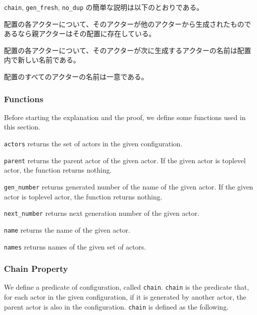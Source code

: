 \texttt{chain}, \texttt{gen\_fresh}, \texttt{no\_dup} の簡単な説明は以下のとおりである。

\begin{description}[style=nextline,leftmargin=12pt,parsep=0pt]
\item[\texttt{chain}]
  配置の各アクターについて、そのアクターが他のアクターから生成されたものであるなら親アクターはその配置に存在している。
\item[\texttt{gen\_fresh}]
  配置の各アクターについて、そのアクターが次に生成するアクターの名前は配置内で新しい名前である。
\item[\texttt{no\_dup}]
  配置のすべてのアクターの名前は一意である。
\end{description}

\subsubsection{Functions}

Before starting the explanation and the proof, we define some functions used in this section.

\begin{description}[style=nextline,leftmargin=12pt,parsep=0pt]
\item[\texttt{actors} $: \textit{Configuration} \rightarrow \textit{Set(Actor)}$]
  \texttt{actors} returns the set of actors in the given configuration.
\item[\texttt{parent} $: \textit{Actor} \rightarrow \textit{Actor}$]
  \texttt{parent} returns the parent actor of the given actor.
  If the given actor is toplevel actor, the function returns nothing. %
\item[\texttt{gen\_number} $: \textit{Actor} \rightarrow \mathbb{N}$]
  \texttt{gen\_number} returns generated number of the name of the given actor.
  If the given actor is toplevel actor, the function returns nothing.
\item[\texttt{next\_number} $: \textit{Actor} \rightarrow \mathbb{N}$]
  \texttt{next\_number} returns next generation number of the given actor.
\item[\texttt{name} $: \textit{Actor} \rightarrow \textit{Name}$]
  \texttt{name} returns the name of the given actor.
\item[\texttt{names} $: \textit{Set(Actor)} \rightarrow \textit{Set(Name)}$]
  \texttt{names} returns names of the given set of actors.
\end{description}

\subsubsection{Chain Property}
We define a predicate of configuration, called \texttt{chain}.
\texttt{chain} is the predicate that, for each actor in the given configuration, if it is generated by another actor, the parent actor is also in the configuration.
\texttt{chain} is defined as the following.

